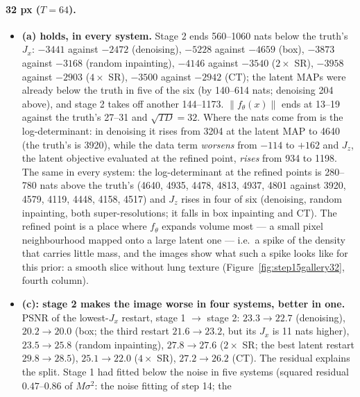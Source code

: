 \documentclass[11pt]{article}
\begin{document}
\paragraph{32 px ($T = 64$).}
\begin{itemize}
  \item \textbf{(a) holds, in every system.} Stage 2 ends 560--1060 nats
        below the truth's $J_x$: $-3441$ against $-2472$ (denoising),
        $-5228$ against $-4659$ (box), $-3873$ against $-3168$ (random
        inpainting), $-4146$ against $-3540$ ($2\times$ SR), $-3958$
        against $-2903$ ($4\times$ SR), $-3500$ against $-2942$ (CT); the
        latent MAPs were already below the truth in five of the six (by
        140--614 nats; denoising 204 above), and stage 2 takes off another
        144--1173. $\|f_\theta(x)\|$ ends at 13--19 against the truth's
        27--31 and $\sqrt{TD} = 32$. Where the nats come from is the
        log-determinant: in denoising it rises from 3204 at the latent MAP
        to 4640 (the truth's is 3920), while the data term \emph{worsens}
        from $-114$ to $+162$ and $J_z$, the latent objective evaluated at
        the refined point, \emph{rises} from 934 to 1198. The same in every
        system: the log-determinant at the refined points is 280--780 nats
        above the truth's (4640, 4935, 4478, 4813, 4937, 4801 against 3920,
        4579, 4119, 4448, 4158, 4517) and $J_z$ rises in four of six
        (denoising, random inpainting, both super-resolutions; it falls in
        box inpainting and CT). The
        refined point is a place where $f_\theta$ expands volume most ---
        a small pixel neighbourhood mapped onto a large latent one --- i.e.\
        a spike of the density that carries little mass, and the images
        show what such a spike looks like for this prior: a smooth slice
        without lung texture (Figure~\ref{fig:step15gallery32}, fourth
        column).
  \item \textbf{(c): stage 2 makes the image worse in four systems, better
        in one.} PSNR of the lowest-$J_x$ restart, stage 1 $\to$ stage 2:
        $23.3 \to 22.7$ (denoising), $20.2 \to 20.0$ (box; the third
        restart $21.6 \to 23.2$, but its $J_x$ is 11 nats higher), $23.5 \to
        25.8$ (random inpainting), $27.8 \to 27.6$ ($2\times$ SR; the best
        latent restart $29.8 \to 28.5$), $25.1 \to 22.0$ ($4\times$ SR),
        $27.2 \to 26.2$ (CT). The residual explains the split. Stage 1 had
        fitted below the noise in five systems (squared residual
        $0.47$--$0.86$ of $M\sigma^2$: the noise fitting of step 14; the

\end{itemize}
\end{document}
